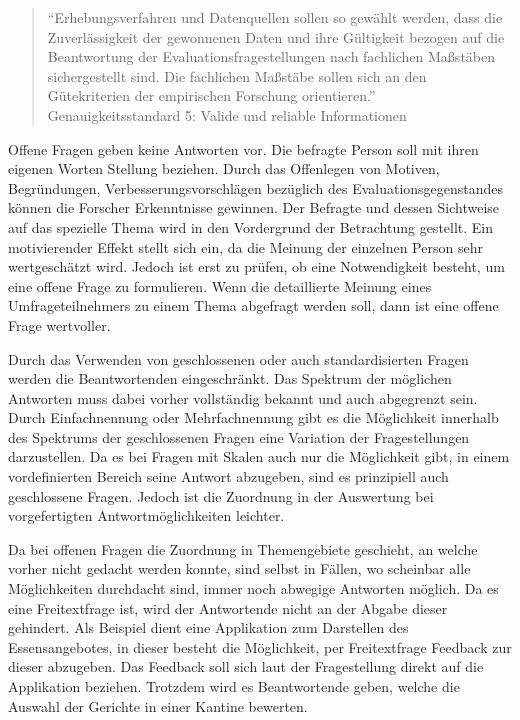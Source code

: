 \begin{quote} \enquote{Erhebungsverfahren und Datenquellen sollen so gewählt werden, dass die Zuverlässigkeit der gewonnenen Daten und ihre Gültigkeit bezogen auf die Beantwortung der Evaluationsfragestellungen nach fachlichen Maßstäben sichergestellt sind. Die fachlichen Maßstäbe sollen sich an den Gütekriterien der empirischen Forschung orientieren.} Genauigkeitsstandard 5: Valide und reliable Informationen\autocite{DegEval} %
\end{quote}

Offene Fragen geben keine Antworten vor. Die befragte Person soll mit ihren eigenen Worten Stellung beziehen.
Durch das Offenlegen von Motiven, Begründungen, Verbesserungsvorschlägen bezüglich des Evaluationsgegenstandes können die Forscher Erkenntnisse gewinnen.
Der Befragte und dessen Sichtweise auf das spezielle Thema wird in den Vordergrund der Betrachtung gestellt\autocite[S.31]{2009Fragebogen}. %
Ein motivierender Effekt stellt sich ein, da die Meinung der einzelnen Person sehr wertgeschätzt wird. 
Jedoch ist erst zu prüfen, ob eine Notwendigkeit besteht, um eine offene Frage zu formulieren. 
Wenn die detaillierte Meinung eines Umfrageteilnehmers zu einem Thema abgefragt werden soll, dann ist eine offene Frage wertvoller. 
 

Durch das Verwenden von geschlossenen oder auch standardisierten Fragen werden die Beantwortenden eingeschränkt.
Das Spektrum der möglichen Antworten muss dabei vorher vollständig bekannt und auch abgegrenzt sein\autocite[S.66]{2014Fragebogen}. %
Durch Einfachnennung oder Mehrfachnennung gibt es die Möglichkeit innerhalb des Spektrums der geschlossenen Fragen eine Variation der Fragestellungen darzustellen\autocite[S.31]{2009Fragebogen}. %
Da es bei Fragen mit Skalen auch nur die Möglichkeit gibt, in einem vordefinierten Bereich seine Antwort abzugeben, sind es prinzipiell auch geschlossene Fragen.
Jedoch ist die Zuordnung in der Auswertung bei vorgefertigten Antwortmöglichkeiten leichter.

Da bei offenen Fragen die Zuordnung in Themengebiete geschieht, an welche vorher nicht gedacht werden konnte, sind selbst in Fällen, wo scheinbar alle Möglichkeiten durchdacht sind, immer noch abwegige Antworten möglich.
Da es eine Freitextfrage ist, wird der Antwortende nicht an der Abgabe dieser gehindert. 
Als Beispiel dient eine Applikation zum Darstellen des Essensangebotes, in dieser besteht die Möglichkeit, per Freitextfrage Feedback zur dieser abzugeben.
Das Feedback soll sich laut der Fragestellung direkt auf die Applikation beziehen.
Trotzdem wird es Beantwortende geben, welche die Auswahl der Gerichte in einer Kantine bewerten.


